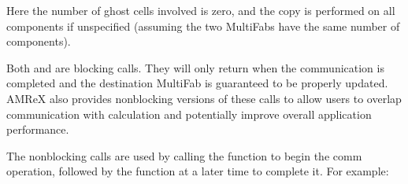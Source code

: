 \documentclass[letterpaper,10pt,english]{sphinxmanual}
\begin{document}
\begin{sphinxVerbatim}[commandchars=\\\{\}]
    
     
\end{sphinxVerbatim}

\sphinxAtStartPar
Here the number of ghost cells involved is zero, and the copy is performed on
all components if unspecified (assuming the two MultiFabs have the same number
of components).

\sphinxAtStartPar
Both  and  are blocking calls. They
will only return when the communication is completed and the destination MultiFab is
guaranteed to be properly updated.  AMReX also provides non\sphinxhyphen{}blocking versions of
these calls to allow users to overlap communication with calculation and potentially
improve overall application performance.

\sphinxAtStartPar
The non\sphinxhyphen{}blocking calls are used by calling the  function
to begin the comm operation, followed by the  function at a later
time to complete it. For example:

\begin{sphinxVerbatim}[commandchars=\\\{\}]
  



\end{sphinxVerbatim}
\end{document}
